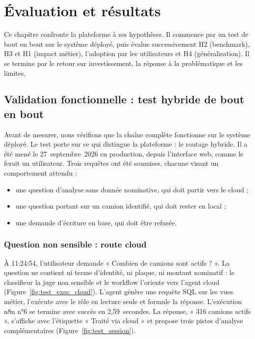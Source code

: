 \chapter{Évaluation et résultats}
\label{chap:evaluation}

Ce chapitre confronte la plateforme à ses hypothèses. Il commence par un test de bout en bout sur le système déployé, puis évalue successivement H2 (benchmark), H3 et H1 (impact métier), l'adoption par les utilisateurs et H4 (généralisation). Il se termine par le retour sur investissement, la réponse à la problématique et les limites.

\section{Validation fonctionnelle : test hybride de bout en bout}
\label{sec:test_bout_en_bout}

Avant de mesurer, nous vérifions que la chaîne complète fonctionne sur le système déployé. Le test porte sur ce qui distingue la plateforme : le routage hybride. Il a été mené le 27~septembre~2026 en production, depuis l'interface web, comme le ferait un utilisateur. Trois requêtes ont été soumises, chacune visant un comportement attendu :

\begin{itemize}
    \item une question d'analyse sans donnée nominative, qui doit partir vers le cloud ;
    \item une question portant sur un camion identifié, qui doit rester en local ;
    \item une demande d'écriture en base, qui doit être refusée.
\end{itemize}

\subsection{Question non sensible : route cloud}
\label{sec:test_cloud}

À 11:24:54, l'utilisateur demande « Combien de camions sont actifs ? ». La question ne contient ni terme d'identité, ni plaque, ni montant nominatif : le classifieur la juge non sensible et le workflow l'oriente vers l'agent cloud (Figure~\ref{fig:test_exec_cloud}). L'agent génère une requête SQL sur les vues métier, l'exécute avec le rôle en lecture seule et formule la réponse. L'exécution n8n n°6 se termine avec succès en 2,59~secondes. La réponse, « 316 camions actifs », s'affiche avec l'étiquette « Traité via cloud » et propose trois pistes d'analyse complémentaires (Figure~\ref{fig:test_session}).

